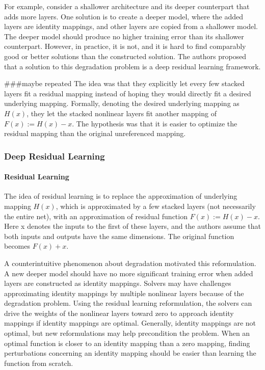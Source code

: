 \documentclass[
]{krantz}
\begin{document}
For example, consider a shallower architecture and its deeper counterpart that adds more layers. One solution is to create a deeper model, where the added layers are identity mappings, and other layers are copied from a shallower model. The deeper model should produce no higher training error than its shallower counterpart. However, in practice, it is not, and it is hard to find comparably good or better solutions than the constructed solution.
The authors proposed that a solution to this degradation problem is a deep residual learning framework.

\#\#\#maybe repeated
The idea was that they explicitly let every few stacked layers fit a residual mapping instead of hoping they would directly fit a desired underlying mapping. Formally, denoting the desired underlying mapping as \(H(x)\), they let the stacked nonlinear layers fit another mapping of \(F \left( x\right):= H\left( x\right) − x\). The hypothesis was that it is easier to optimize the residual mapping than the original unreferenced mapping.

\hypertarget{deep-residual-learning}{%
\subsubsection{Deep Residual Learning}\label{deep-residual-learning}}

\hypertarget{residual-learning}{%
\paragraph{Residual Learning}\label{residual-learning}}

The idea of residual learning is to replace the approximation of underlying mapping \(H\left( x\right)\), which is approximated by a few stacked layers (not necessarily the entire net), with an approximation of residual function \(F(x):= H\left( x \right) − x\). Here x denotes the inputs to the first of these layers, and the authors assume that both inputs and outputs have the same dimensions. The original function becomes \(F\left( x \right)+x\).

A counterintuitive phenomenon about degradation motivated this reformulation. A new deeper model should have no more significant training error when added layers are constructed as identity mappings. Solvers may have challenges approximating identity mappings by multiple nonlinear layers because of the degradation problem. Using the residual learning reformulation, the solvers can drive the weights of the nonlinear layers toward zero to approach identity mappings if identity mappings are optimal.
Generally, identity mappings are not optimal, but new reformulations may help precondition the problem. When an optimal function is closer to an identity mapping than a zero mapping, finding perturbations concerning an identity mapping should be easier than learning the function from scratch.
\end{document}
